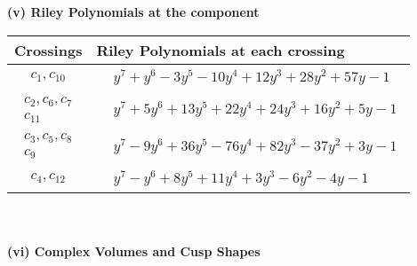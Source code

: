 \documentclass[1p]{elsarticle_modified}
\theoremstyle{definition}
\begin{document}
\newpage\renewcommand{\arraystretch}{1}
\flushleft \textbf{(v) Riley Polynomials at the component}\newline \\
\begin{tabular}{m{50pt}|m{274pt}}
Crossings & \hspace{64pt}Riley Polynomials at each crossing \\
\hline $$\begin{aligned}c_{1},c_{10}\end{aligned}$$&$\begin{aligned}
&y^7+y^6-3 y^5-10 y^4+12 y^3+28 y^2+57 y-1
\end{aligned}$\\
\hline $$\begin{aligned}c_{2},c_{6},c_{7}\\c_{11}\end{aligned}$$&$\begin{aligned}
&y^7+5 y^6+13 y^5+22 y^4+24 y^3+16 y^2+5 y-1
\end{aligned}$\\
\hline $$\begin{aligned}c_{3},c_{5},c_{8}\\c_{9}\end{aligned}$$&$\begin{aligned}
&y^7-9 y^6+36 y^5-76 y^4+82 y^3-37 y^2+3 y-1
\end{aligned}$\\
\hline $$\begin{aligned}c_{4},c_{12}\end{aligned}$$&$\begin{aligned}
&y^7- y^6+8 y^5+11 y^4+3 y^3-6 y^2-4 y-1
\end{aligned}$\\
\hline
\end{tabular}\\~\\
\newpage\flushleft \textbf{(vi) Complex Volumes and Cusp Shapes}
\end{document}
